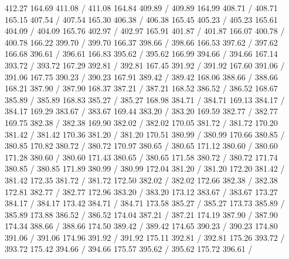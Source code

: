 { 412.27 164.69 411.08 /
 411.08 164.84 409.89 /
 409.89 164.99 408.71 /
 408.71 165.15 407.54 /
 407.54 165.30 406.38 /
 406.38 165.45 405.23 /
 405.23 165.61 404.09 /
 404.09 165.76 402.97 /
 402.97 165.91 401.87 /
 401.87 166.07 400.78 /
 400.78 166.22 399.70 /
 399.70 166.37 398.66 /
 398.66 166.53 397.62 /
 397.62 166.68 396.61 /
 396.61 166.83 395.62 /
 395.62 166.99 394.66 /
 394.66 167.14 393.72 /
 393.72 167.29 392.81 /
 392.81 167.45 391.92 /
 391.92 167.60 391.06 /
 391.06 167.75 390.23 /
 390.23 167.91 389.42 /
 389.42 168.06 388.66 /
 388.66 168.21 387.90 /
 387.90 168.37 387.21 /
 387.21 168.52 386.52 /
 386.52 168.67 385.89 /
 385.89 168.83 385.27 /
 385.27 168.98 384.71 /
 384.71 169.13 384.17 /
 384.17 169.29 383.67 /
 383.67 169.44 383.20 /
 383.20 169.59 382.77 /
 382.77 169.75 382.38 /
 382.38 169.90 382.02 /
 382.02 170.05 381.72 /
 381.72 170.20 381.42 /
 381.42 170.36 381.20 /
 381.20 170.51 380.99 /
 380.99 170.66 380.85 /
 380.85 170.82 380.72 /
 380.72 170.97 380.65 /
 380.65 171.12 380.60 /
 380.60 171.28 380.60 /
 380.60 171.43 380.65 /
 380.65 171.58 380.72 /
 380.72 171.74 380.85 /
 380.85 171.89 380.99 /
 380.99 172.04 381.20 /
 381.20 172.20 381.42 /
 381.42 172.35 381.72 /
 381.72 172.50 382.02 /
 382.02 172.66 382.38 /
 382.38 172.81 382.77 /
 382.77 172.96 383.20 /
 383.20 173.12 383.67 /
 383.67 173.27 384.17 /
 384.17 173.42 384.71 /
 384.71 173.58 385.27 /
 385.27 173.73 385.89 /
 385.89 173.88 386.52 /
 386.52 174.04 387.21 /
 387.21 174.19 387.90 /
 387.90 174.34 388.66 /
 388.66 174.50 389.42 /
 389.42 174.65 390.23 /
 390.23 174.80 391.06 /
 391.06 174.96 391.92 /
 391.92 175.11 392.81 /
 392.81 175.26 393.72 /
 393.72 175.42 394.66 /
 394.66 175.57 395.62 /
 395.62 175.72 396.61 /
}

